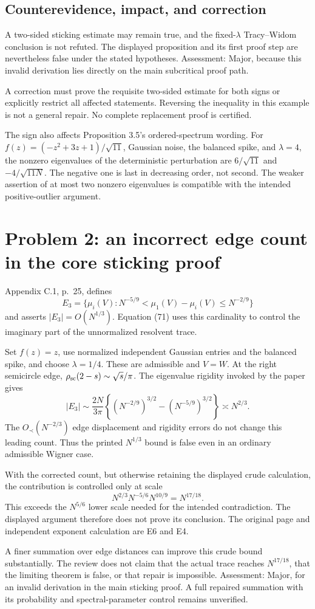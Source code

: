 \documentclass[10pt]{article}
\begin{document}
\subsection*{Counterevidence, impact, and correction}
A two-sided sticking estimate may remain true, and the fixed-\(\lambda\) Tracy–Widom conclusion is not refuted. The displayed proposition and its first proof step are nevertheless false under the stated hypotheses. Assessment: Major, because this invalid derivation lies directly on the main subcritical proof path.\par
A correction must prove the requisite two-sided estimate for both signs or explicitly restrict all affected statements. Reversing the inequality in this example is not a general repair. No complete replacement proof is certified.\par
The sign also affects Proposition 3.5’s ordered-spectrum wording. For \(f(z)=(-z^2+3z+1)/\sqrt{11}\), Gaussian noise, the balanced spike, and \(\lambda=4\), the nonzero eigenvalues of the deterministic perturbation are \(6/\sqrt{11}\) and \(-4/\sqrt{11N}\). The negative one is last in decreasing order, not second. The weaker assertion of at most two nonzero eigenvalues is compatible with the intended positive-outlier argument.\par
\section*{Problem 2: an incorrect edge count in the core sticking proof}
Appendix C.1, p. 25, defines \[E_3=\{\mu_i(V):N^{-5/9}<\mu_1(V)-\mu_i(V)\leq N^{-2/9}\}\] and asserts \(|E_3|=O(N^{1/3})\). Equation (71) uses this cardinality to control the imaginary part of the unnormalized resolvent trace.\par
Set \(f(z)=z\), use normalized independent Gaussian entries and the balanced spike, and choose \(\lambda=1/4\). These are admissible and \(V=W\). At the right semicircle edge, \(\rho_{\rm sc}(2-s)\sim\sqrt{s}/\pi\). The eigenvalue rigidity invoked by the paper gives \[|E_3|\sim\frac{2N}{3\pi}
   \left\{(N^{-2/9})^{3/2}-(N^{-5/9})^{3/2}\right\}
   \asymp N^{2/3}.\] The \(O_\prec(N^{-2/3})\) edge displacement and rigidity errors do not change this leading count. Thus the printed \(N^{1/3}\) bound is false even in an ordinary admissible Wigner case.\par
With the corrected count, but otherwise retaining the displayed crude calculation, the contribution is controlled only at scale \[N^{2/3}N^{-5/6}N^{10/9}=N^{17/18}.\] This exceeds the \(N^{5/6}\) lower scale needed for the intended contradiction. The displayed argument therefore does not prove its conclusion. The original page and independent exponent calculation are E6 and E4.\par
A finer summation over edge distances can improve this crude bound substantially. The review does not claim that the actual trace reaches \(N^{17/18}\), that the limiting theorem is false, or that repair is impossible. Assessment: Major, for an invalid derivation in the main sticking proof. A full repaired summation with its probability and spectral-parameter control remains unverified.\par
\end{document}
